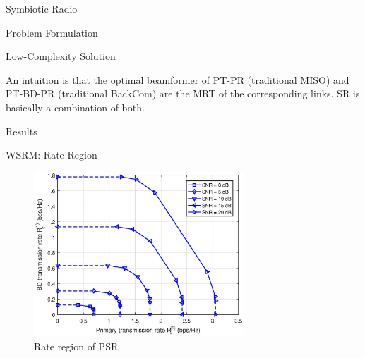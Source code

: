\documentclass[9pt]{beamer}
\begin{document}
\begin{section}{Symbiotic Radio}
\begin{subsection}{Problem Formulation}
\begin{frame}{Low-Complexity Solution}
				\vspace{1em}

				An intuition is that the optimal beamformer of PT-PR (traditional MISO) and PT-BD-PR (traditional BackCom) are the MRT of the corresponding links. SR is basically a combination of both.
			\end{frame}
		\end{subsection}

		\begin{subsection}{Results}
			\begin{frame}{WSRM: Rate Region}
				\begin{figure}
					\centering
					\includegraphics[width=0.7\textwidth]{assets/psr_region.eps}
					\caption{Rate region of PSR \cite{Long2019a}}
					\label{fi:psr_region}
				\end{figure}
			\end{frame}


\end{subsection}
\end{section}
\end{document}
